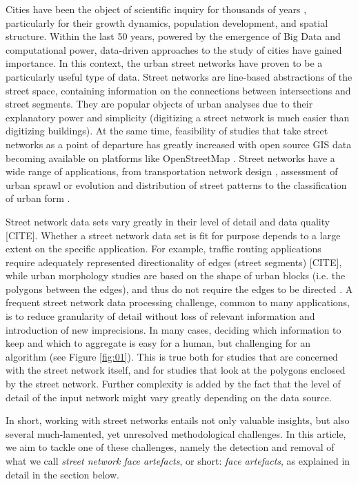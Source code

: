 Cities have been the object of scientific inquiry for thousands of years
\cite{vitruvius_vitruvius_1999}, particularly for their growth dynamics, population
development, and spatial structure. Within the last 50 years, powered by the emergence
of Big Data and computational power, data-driven approaches to the study of cities have
gained importance. In this context, the urban street networks have proven to be a
particularly useful type of data. Street networks are line-based abstractions of the
street space, containing information on the connections between intersections and street
segments. They are popular objects of urban analyses due to their explanatory power and
simplicity (digitizing a street network is much easier than digitizing buildings). At
the same time, feasibility of studies that take street networks as a point of departure
has greatly increased with open source GIS data becoming available on platforms like
OpenStreetMap \cite{arcaute_recent_2021}. Street networks have a wide range of
applications, from transportation network design \cite{farahani_review_2013}, assessment
of urban sprawl \cite{barrington-leigh_global_2020} or evolution and distribution of
street patterns \cite{boeing_multi-scale_2018,boeing2020off} to the classification of
urban form \cite{araldi_street_2019,fleischmann_methodological_2021}.

Street network data sets vary greatly in their level of detail and data quality [CITE].
Whether a street network data set is fit for purpose depends to a large extent on the
specific application. For example, traffic routing applications require adequately
represented directionality of edges (street segments) [CITE], while urban morphology
studies are based on the shape of urban blocks (i.e. the polygons between the edges),
and thus do not require the edges to be directed \cite{dibble_origin_2019}. A frequent
street network data processing challenge, common to many applications, is to reduce
granularity of detail without loss of relevant information and introduction of new
imprecisions. In many cases, deciding which information to keep and which to aggregate
is easy for a human, but challenging for an algorithm (see Figure \ref{fig:01}). This is
true both for studies that are concerned with the street network itself, and for studies
that look at the polygons enclosed by the street network. Further complexity is added by
the fact that the level of detail of the input network might vary greatly depending on
the data source.

In short, working with street networks entails not only valuable insights, but also
several much-lamented, yet unresolved methodological challenges. In this article, we aim
to tackle one of these challenges, namely the detection and removal of what we call
\textit{street network face artefacts}, or short: \textit{face artefacts}, as explained
in detail in the section below.

